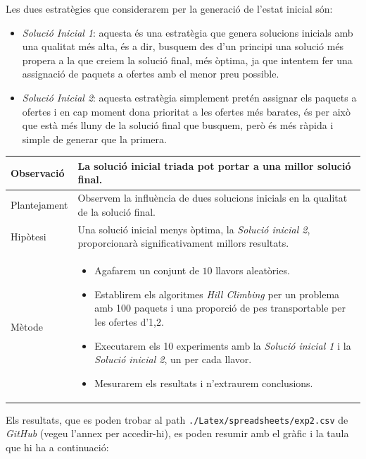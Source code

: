 \documentclass[a4paper]{article}
\begin{document}
	Les dues estratègies que considerarem per la generació de l'estat inicial són:
	
	\begin{itemize}
		\item \emph{Solució Inicial 1}: aquesta és una estratègia que genera solucions inicials amb una qualitat més alta, és a dir, busquem des d'un principi una solució més propera a la que creiem la solució final, més òptima, ja que intentem fer una assignació de paquets a ofertes amb el menor preu possible.
		
		\item \emph{Solució Inicial 2}: aquesta estratègia simplement pretén assignar els paquets a ofertes i en cap moment dona prioritat a les ofertes més barates, és per això que està més lluny de la solució final que busquem, però és més ràpida i simple de generar que la primera.
	\end{itemize}
	
	
	\begin{table}[ht]
		\centering
		\begin{tabular}{|l|p{10cm}|}
			\hline
			Observació & La solució inicial triada pot portar a una millor solució final. \\
			\hline
			Plantejament & Observem la influència de dues solucions inicials en la qualitat de la solució final. \\
			\hline
			Hipòtesi & Una solució inicial menys òptima, la \textit{Solució inicial 2}, proporcionarà significativament millors resultats.\\
			\hline
			Mètode & 
			\begin{itemize}
				\item Agafarem un conjunt de $10$ llavors aleatòries.
				\item Establirem els algoritmes \textit{Hill Climbing} per un problema amb 100 paquets i una proporció de pes transportable per les ofertes d'1,2.
				\item Executarem els 10 experiments amb la \textit{Solució inicial 1} i la \textit{Solució inicial 2}, un per cada llavor.
				\item Mesurarem els resultats i n'extraurem conclusions.
			\end{itemize} \\
			\hline
		\end{tabular}
		\label{tab:exp2_apartats}
	\end{table}
	
	Els resultats, que es poden trobar al path \texttt{./Latex/spreadsheets/exp2.csv} de \textit{GitHub} (vegeu l'annex per accedir-hi), es poden resumir amb el gràfic i la taula que hi ha a continuació:
	
\end{document}
